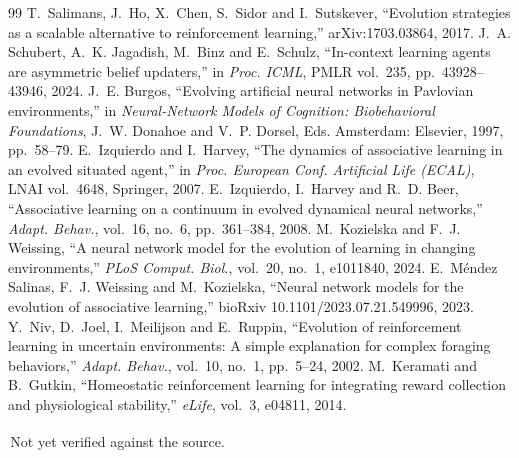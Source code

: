 \documentclass[conference]{IEEEtran}
\newcommand{\unv}{\textsuperscript{\dag}}
\begin{document}
\begin{thebibliography}{99}
 T.~Salimans, J.~Ho, X.~Chen, S.~Sidor and I.~Sutskever, ``Evolution strategies as a scalable alternative to reinforcement learning,'' arXiv:1703.03864, 2017.
 J.~A. Schubert, A.~K. Jagadish, M.~Binz and E.~Schulz, ``In-context learning agents are asymmetric belief updaters,'' in \textit{Proc. ICML}, PMLR vol.~235, pp.~43928--43946, 2024.
 J.~E. Burgos, ``Evolving artificial neural networks in Pavlovian environments,'' in \textit{Neural-Network Models of Cognition: Biobehavioral Foundations}, J.~W. Donahoe and V.~P. Dorsel, Eds. Amsterdam: Elsevier, 1997, pp.~58--79.
 E.~Izquierdo and I.~Harvey, ``The dynamics of associative learning in an evolved situated agent,'' in \textit{Proc. European Conf. Artificial Life (ECAL)}, LNAI vol.~4648, Springer, 2007.
 E.~Izquierdo, I.~Harvey and R.~D. Beer, ``Associative learning on a continuum in evolved dynamical neural networks,'' \textit{Adapt. Behav.}, vol.~16, no.~6, pp.~361--384, 2008.
 M.~Kozielska and F.~J. Weissing, ``A neural network model for the evolution of learning in changing environments,'' \textit{PLoS Comput. Biol.}, vol.~20, no.~1, e1011840, 2024.
 E.~M\'endez Salinas, F.~J. Weissing and M.~Kozielska, ``Neural network models for the evolution of associative learning,'' bioRxiv 10.1101/2023.07.21.549996, 2023.
 Y.~Niv, D.~Joel, I.~Meilijson and E.~Ruppin, ``Evolution of reinforcement learning in uncertain environments: A simple explanation for complex foraging behaviors,'' \textit{Adapt. Behav.}, vol.~10, no.~1, pp.~5--24, 2002.
 M.~Keramati and B.~Gutkin, ``Homeostatic reinforcement learning for integrating reward collection and physiological stability,'' \textit{eLife}, vol.~3, e04811, 2014.
\end{thebibliography}
\noindent\footnotesize{\unv\,Not yet verified against the source.}
\end{document}
